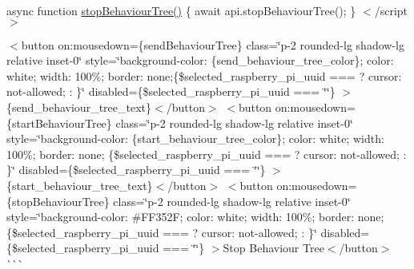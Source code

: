 async function \mbox{\hyperlink{behaviour__tree_8js_a918578916851725276d5212a9646aec4}{stop\+Behaviour\+Tree()}} \{ await api.\+stop\+Behaviour\+Tree(); \} $<$/script$>$

 \texorpdfstring{$<$}{<}button on\+:mousedown=\{send\+Behaviour\+Tree\} class=\char`\"{}p-\/2 rounded-\/lg shadow-\/lg relative inset-\/0\char`\"{} style=\char`\"{}background-\/color\+: \{send\+\_\+behaviour\+\_\+tree\+\_\+color\}; color\+: white; width\+: 100\%; border\+: none;\{\$selected\+\_\+raspberry\+\_\+pi\+\_\+uuid ===         \textquotesingle{}\textquotesingle{}             ? \textquotesingle{}cursor\+: not-\/allowed;\textquotesingle{}             \+: \textquotesingle{}\textquotesingle{}\}\char`\"{} disabled=\{\$selected\+\_\+raspberry\+\_\+pi\+\_\+uuid === \char`\"{}\char`\"{}\} \texorpdfstring{$>$}{>}\{send\+\_\+behaviour\+\_\+tree\+\_\+text\}$<$/button$>$ \texorpdfstring{$<$}{<}button on\+:mousedown=\{start\+Behaviour\+Tree\} class=\char`\"{}p-\/2 rounded-\/lg shadow-\/lg relative inset-\/0\char`\"{} style=\char`\"{}background-\/color\+: \{start\+\_\+behaviour\+\_\+tree\+\_\+color\}; color\+: white; width\+: 100\%; border\+: none; \{\$selected\+\_\+raspberry\+\_\+pi\+\_\+uuid ===         \textquotesingle{}\textquotesingle{}             ? \textquotesingle{}cursor\+: not-\/allowed;\textquotesingle{}             \+: \textquotesingle{}\textquotesingle{}\}\char`\"{} disabled=\{\$selected\+\_\+raspberry\+\_\+pi\+\_\+uuid === \char`\"{}\char`\"{}\} \texorpdfstring{$>$}{>}\{start\+\_\+behaviour\+\_\+tree\+\_\+text\}$<$/button$>$ \texorpdfstring{$<$}{<}button on\+:mousedown=\{stop\+Behaviour\+Tree\} class=\char`\"{}p-\/2 rounded-\/lg shadow-\/lg relative inset-\/0\char`\"{} style=\char`\"{}background-\/color\+: \#\+FF352\+F; color\+: white; width\+: 100\%; border\+: none; \{\$selected\+\_\+raspberry\+\_\+pi\+\_\+uuid ===         \textquotesingle{}\textquotesingle{}             ? \textquotesingle{}cursor\+: not-\/allowed;\textquotesingle{}             \+: \textquotesingle{}\textquotesingle{}\}\char`\"{} disabled=\{\$selected\+\_\+raspberry\+\_\+pi\+\_\+uuid === \char`\"{}\char`\"{}\} \texorpdfstring{$>$}{>}Stop Behaviour Tree$<$/button$>$  \`{}\`{}\`{} 